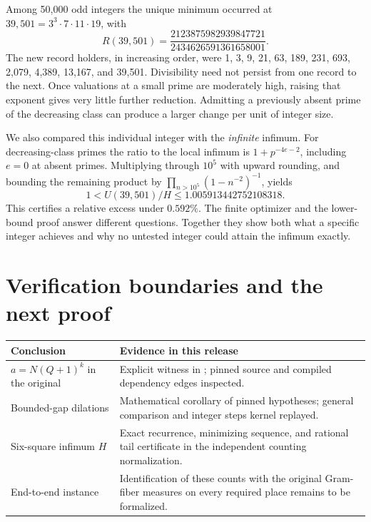 \documentclass[12pt,letterpaper]{article}
\newcommand{\code}[1]{\texttt{\detokenize{#1}}}
\begin{document}
Among 50,000 odd integers the unique minimum occurred at \(39{,}501=3^3\cdot7\cdot11\cdot19\), with
\[
 R(39{,}501)=
 \frac{2123875982939847721}{2434626591361658001}.
\]
The new record holders, in increasing order, were 1, 3, 9, 21, 63, 189, 231, 693, 2,079, 4,389, 13,167, and 39,501. Divisibility need not persist from one record to the next. Once valuations at a small prime are moderately high, raising that exponent gives very little further reduction. Admitting a previously absent prime of the decreasing class can produce a larger change per unit of integer size.

We also compared this individual integer with the \emph{infinite} infimum. For decreasing-class primes the ratio to the local infimum is \(1+p^{-4e-2}\), including \(e=0\) at absent primes. Multiplying through \(10^5\) with upward rounding, and bounding the remaining product by \(\prod_{n>10^5}(1-n^{-2})^{-1}\), yields
\[
          1<U(39{,}501)/H\le1.005913442752108318 .
\]
This certifies a relative excess under \(0.592\%\). The finite optimizer and the lower-bound proof answer different questions. Together they show both what a specific integer achieves and why no untested integer could attain the infimum exactly.

\clearpage\section{Verification boundaries and the next proof}
\begin{center}\small\begin{tabularx}{\linewidth}{@{}p{.28\linewidth}Y@{}}\toprule
Conclusion & Evidence in this release\\\midrule
\(a=N(Q+1)^k\) in the original & Explicit witness in \code{growth_main}; pinned source and compiled dependency edges inspected.\\
Bounded-gap dilations & Mathematical corollary of pinned hypotheses; general comparison and integer steps kernel replayed.\\
Six-square infimum \(H\) & Exact recurrence, minimizing sequence, and rational tail certificate in the independent counting normalization.\\
End-to-end instance & Identification of these counts with the original Gram-fiber measures on every required place remains to be formalized.\\\bottomrule
\end{tabularx}\end{center}
\end{document}
